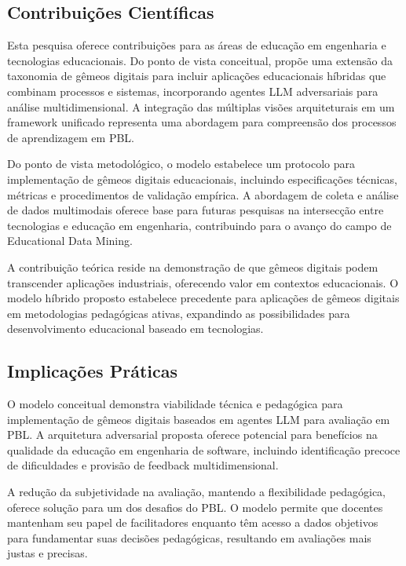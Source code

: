 \documentclass[english, spanish, brazilian]{modelo_dt}
\begin{document}
\subsection{Contribuições Científicas}

Esta pesquisa oferece contribuições para as áreas de educação em engenharia e
tecnologias educacionais\@. Do ponto de vista conceitual, propõe uma extensão
da taxonomia de gêmeos digitais para incluir aplicações educacionais híbridas
que combinam processos e sistemas, incorporando agentes LLM adversariais para
análise multidimensional\@. A integração das múltiplas visões arquiteturais em um
framework unificado representa uma abordagem para compreensão dos processos de
aprendizagem em PBL\@.

Do ponto de vista metodológico, o modelo estabelece um protocolo para
implementação de gêmeos digitais educacionais, incluindo especificações
técnicas, métricas e procedimentos de validação empírica\@. A abordagem de
coleta e análise de dados multimodais oferece base para futuras pesquisas na
intersecção entre tecnologias e educação em engenharia, contribuindo para o
avanço do campo de Educational Data Mining\@.

A contribuição teórica reside na demonstração de que gêmeos digitais podem
transcender aplicações industriais, oferecendo valor em contextos
educacionais\@. O modelo híbrido proposto estabelece precedente para aplicações
de gêmeos digitais em metodologias pedagógicas ativas, expandindo as
possibilidades para desenvolvimento educacional baseado em tecnologias\@.

\subsection{Implicações Práticas}

O modelo conceitual demonstra viabilidade técnica e pedagógica para
implementação de gêmeos digitais baseados em agentes LLM para avaliação em
PBL\@. A arquitetura adversarial proposta oferece potencial para benefícios na
qualidade da educação em engenharia de software, incluindo identificação
precoce de dificuldades e provisão de feedback multidimensional\@.

A redução da subjetividade na avaliação, mantendo a flexibilidade pedagógica,
oferece solução para um dos desafios do PBL\@. O modelo permite que docentes
mantenham seu papel de facilitadores enquanto têm acesso a dados objetivos para
fundamentar suas decisões pedagógicas, resultando em avaliações mais justas e
precisas\@.
\end{document}
